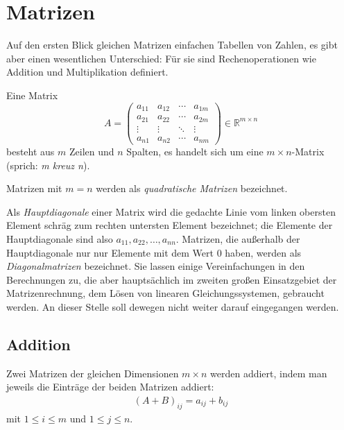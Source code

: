 

\section{Matrizen}
Auf den ersten Blick gleichen Matrizen einfachen Tabellen von Zahlen, es gibt aber einen wesentlichen Unterschied: Für sie sind Rechenoperationen wie Addition und Multiplikation definiert.

Eine Matrix
\begin{equation}
 A = \begin{pmatrix}
   a_{11} & a_{12} & \cdots & a_{1m}\\
   a_{21} & a_{22} & \cdots & a_{2m}\\
   \vdots & \vdots & \ddots & \vdots\\
   a_{n1} & a_{n2} & \cdots & a_{nm}
 \end{pmatrix}
 \in \mathbb{R}^{m \times n}
\end{equation}
besteht aus $m$ Zeilen und $n$ Spalten, es handelt sich um eine $m \times n$-Matrix (sprich: \emph{m kreuz n}).

Matrizen mit $m = n$ werden als \emph{quadratische Matrizen} bezeichnet.

Als \emph{Hauptdiagonale} einer Matrix wird die gedachte Linie vom linken obersten Element schräg zum rechten untersten Element bezeichnet; die Elemente der Hauptdiagonale sind also $a_{11}, a_{22}, \ldots, a_{nn}$. Matrizen, die außerhalb der Hauptdiagonale nur nur Elemente mit dem Wert 0 haben, werden als \emph{Diagonalmatrizen} bezeichnet. Sie lassen einige Vereinfachungen in den Berechnungen zu, die aber hauptsächlich im zweiten großen Einsatzgebiet der Matrizenrechnung, dem Lösen von linearen Gleichungssystemen, gebraucht werden. An dieser Stelle soll dewegen nicht weiter darauf eingegangen werden.


\subsection{Addition}
Zwei Matrizen der gleichen Dimensionen $m \times n$ werden addiert, indem man jeweils die Einträge der beiden Matrizen addiert:
\begin{align}
 (A + B)_{ij} = a_{ij} + b_{ij}%
\end{align}
mit $1 \leq i \leq m$ und $1 \leq j \leq n$.

